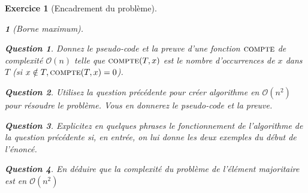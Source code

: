 \documentclass{article}
\theoremstyle{exostyle}
\newtheorem{exo}{Exercice}
\theoremstyle{partiestyle}
\newtheorem{partie}{}[exo]
\theoremstyle{questionstyle}
\newtheorem{questionpartie}{Question}[partie]
\begin{document}
\begin{exo}[Encadrement du problème]
\begin{partie}[Borne maximum]
\begin{questionpartie}
    Donnez le pseudo-code et la preuve d'une fonction $\textsc{compte}$ de complexité $\mathcal{O}(n)$ telle que $\textsc{compte}(T, x)$ est le nombre d'occurrences de $x$ dans $T$ (si $x\notin T, \textsc{compte}(T, x) = 0$).
\end{questionpartie}
\begin{questionpartie}
    \label{naif}
    Utilisez la question précédente pour créer algorithme en $\mathcal{O}(n^2)$ pour résoudre le problème. Vous en donnerez le pseudo-code et la preuve.
\end{questionpartie}
\begin{questionpartie}
    Explicitez en quelques phrases le fonctionnement de l'algorithme de la question précédente si, en entrée, on lui donne les deux exemples du début de l'énoncé. 
\end{questionpartie}            
\begin{questionpartie}
    En déduire que la complexité du problème de l'élément majoritaire est en $\mathcal{O}(n^2)$
\end{questionpartie}
\end{partie}

\end{exo}
\end{document}
